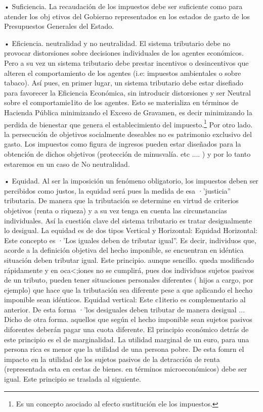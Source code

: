 \documentclass[10pt,a4paper]{article}
\begin{document}
{• Suficiencia. La recaudación de los impuestos debe ser suficiente como para atender los obj etivos del Gobierno representados en los estados de gasto de los Presupuestos Generales del Estado.

• Eficiencia. neutralidad y no neutralidad. El sistema tributario debe no provocar distorsiones sobre decisiones individuales de los agentes económicos. Pero a su vez un sistema tributario debe prestar incentivos o desincentivos que alteren el comportamiento de los agentes (i.e: impuestos ambientales o sobre tabaco).   Así pues, en primer lugar, un sistema tributario debe estar disefiado para favorecer la Eficiencia Económica, sin introducir distorsiones y ser Neutral sobre el comportamie1ito de los agentes. Esto se materializa en términos de Hacienda Pública minimizando el Exceso de Gravamen, es decir minimizando la perdida de bienestar que genera el establecimiento del impuesto.\footnote{Es un concepto asociado al efecto sustitución ele los impuestos.
} Por otro lado. la persecución de objetivos socialmente deseables no es patrimonio exclusivo del gasto. Los impuestos como figura de ingresos pueden estar diseñados para la obtención de dichos objetivos (protección de minusvalía. etc .... ) y por lo tanto estaremos en un caso de No neutralidad.

• Equidad. Al ser la imposición un fenómeno obligatorio, los impuestos deben ser percibidos como justos, la equidad será pues la medida de esa ·'justicia'' tributaria. De manera que la tributación se determine en virtud de criterios objetivos (renta o riqueza) y a su vez tenga en cuenta las circunstancias individuales. Así la cuestión clave del sistema tributario es tratar desigualmente lo desigual. La equidad es de dos tipos Vertical y Horizontal: Equidad Horizontal: Este concepto es ·'Los iguales deben de tributar igual''. Es decir, individuos que, acorde a la definición objetiva del hecho imponible, se encuentran en idéntica situación deben tributar igual. Este principio. aunque sencillo. queda modificado rápidamente y en oca<;iones no se cumplirá, pues dos individuos sujetos pasivos de un tributo, pueden tener situaciones personales diferentes ( hijos a cargo, por ejemplo) que hace que la tributación sea diferente pese a que aplicando el hecho imponible sean idénticos. Equidad vertical: Este c1iterio es complementario al anterior. De esta forma ·'los desiguales deben tributar de manera desigual ... Dicho de otra forma. aquellos que según el hecho imponible sean sujetos pasivos diforentes deberán pagar una cuota diferente. El principio económico detrás de este principio es el de marginalidad. La utilidad marginal de un euro, para una persona rica es menor que la utilidad de una persona pobre. De esta fomrn el impacto en la utilidad de los sujetos pasivos de la detracción de renta (representada esta en cestas de bienes. en términos microeconómicos) debe ser igual. Este principio se traslada al siguiente.

}
\end{document}
